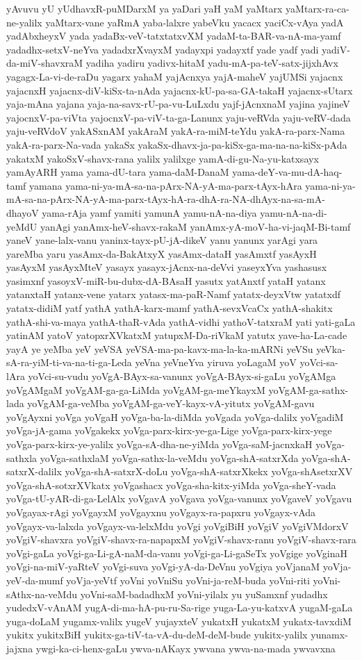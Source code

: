 {yAvuvu
yU
yUdhavxR-puMDarxM
ya
yaDari
yaH
yaM
yaMtarx
yaMtarx-ra-ca-ne-yalilx
yaMtarx-vane
yaRmA
yaba-lalxre
yabeVku
yacacx
yaciCx-vAya
yadA
yadAbxheyxV
yada
yadaBx-veV-tatxtatxvXM
yadaM-ta-BAR-va-nA-ma-yamf
yadadhx-setxV-neYva
yadadxrXvayxM
yadayxpi
yadayxtf
yade
yadf
yadi
yadiV-da-miV-shavxraM
yadiha
yadiru
yadivx-hitaM
yadu-mA-pa-teV-satx-jijxhAvx
yagagx-La-vi-de-raDu
yagarx
yahaM
yajAcnxya
yajA-maheV
yajUMSi
yajacnx
yajacnxH
yajacnx-diV-kiSx-ta-nAda
yajacnx-kU-pa-sa-GA-takaH
yajacnx-sUtarx
yaja-mAna
yajana
yaja-na-savx-rU-pa-vu-LuLxdu
yajf-jAcnxnaM
yajina
yajineV
yajocnxV-pa-viVta
yajocnxV-pa-viV-ta-ga-Lanunx
yaju-veRVda
yaju-veRV-dada
yaju-veRVdoV
yakASxnAM
yakAraM
yakA-ra-miM-teYdu
yakA-ra-parx-Nama
yakA-ra-parx-Na-vada
yakaSx
yakaSx-dhavx-ja-pa-kiSx-ga-ma-na-na-kiSx-pAda
yakatxM
yakoSxV-shavx-rana
yalilx
yalilxge
yamA-di-gu-Na-yu-katxsayx
yamAyARH
yama
yama-dU-tara
yama-daM-DanaM
yama-deY-va-mu-dA-haq-tamf
yamana
yama-ni-ya-mA-sa-na-pArx-NA-yA-ma-parx-tAyx-hAra
yama-ni-ya-mA-sa-na-pArx-NA-yA-ma-parx-tAyx-hA-ra-dhA-ra-NA-dhAyx-na-sa-mA-dhayoV
yama-rAja
yamf
yamiti
yamunA
yamu-nA-na-diya
yamu-nA-na-di-yeMdU
yanAgi
yanAmx-heV-shavx-rakaM
yanAmx-yA-moV-ha-vi-jaqM-Bi-tamf
yaneV
yane-lalx-vanu
yaninx-tayx-pU-jA-dikeV
yanu
yanunx
yarAgi
yara
yareMba
yaru
yasAmx-da-BakAtxyX
yasAmx-dataH
yasAmxtf
yasAyxH
yasAyxM
yasAyxMteV
yasayx
yasayx-jAcnx-na-deVvi
yaseyxYva
yashasusx
yasimxnf
yasoyxV-miR-bu-dubx-dA-BAsaH
yasutx
yatAnxtf
yataH
yatanx
yatanxtaH
yatanx-vene
yatarx
yatasx-ma-paR-Namf
yatatx-deyxVtw
yatatxdf
yatatx-didiM
yatf
yathA
yathA-karx-mamf
yathA-sevxVcaCx
yathA-shakitx
yathA-shi-va-maya
yathA-thaR-vAda
yathA-vidhi
yathoV-tatxraM
yati
yati-gaLa
yatinAM
yatoV
yatopxrXVkatxM
yatupxM-Da-riVkaM
yatutx
yave-ha-La-cade
yayA
ye
yeMba
yeV
yeVSA
yeVSA-ma-pa-kavx-ma-la-ka-mARNi
yeVSu
yeVka-sA-ra-yiM-ti-va-na-ti-ga-Leda
yeVna
yeVneYva
yiruva
yoLagaM
yoV
yoVci-sa-lAra
yoVci-su-vudu
yoVgA-BAyx-sa-vanunx
yoVgA-BAyx-si-gaLu
yoVgAMga
yoVgAMgaM
yoVgAM-ga-ga-LiMda
yoVgAM-ga-meYkayxM
yoVgAM-ga-sathx-lada
yoVgAM-ga-veMba
yoVgAM-ga-veY-kayx-vA-yitutx
yoVgAM-gavu
yoVgAyxni
yoVga
yoVgaH
yoVga-ba-la-diMda
yoVgada
yoVga-dalilx
yoVgadiM
yoVga-jA-gama
yoVgakekx
yoVga-parx-kirx-ye-ga-Lige
yoVga-parx-kirx-yege
yoVga-parx-kirx-ye-yalilx
yoVga-sA-dha-ne-yiMda
yoVga-saM-jacnxkaH
yoVga-sathxla
yoVga-sathxlaM
yoVga-sathx-la-veMdu
yoVga-shA-satxrXda
yoVga-shA-satxrX-dalilx
yoVga-shA-satxrX-doLu
yoVga-shA-satxrXkekx
yoVga-shAsetxrXV
yoVga-shA-sotxrXVkatx
yoVgashacx
yoVga-sha-kitx-yiMda
yoVga-sheY-vada
yoVga-tU-yAR-di-ga-LelAlx
yoVgavA
yoVgava
yoVga-vanunx
yoVgaveV
yoVgavu
yoVgayax-rAgi
yoVgayxM
yoVgayxnu
yoVgayx-ra-papxru
yoVgayx-vAda
yoVgayx-va-lalxda
yoVgayx-va-lelxMdu
yoVgi
yoVgiBiH
yoVgiV
yoVgiVMdorxV
yoVgiV-shavxra
yoVgiV-shavx-ra-napapxM
yoVgiV-shavx-ranu
yoVgiV-shavx-rara
yoVgi-gaLa
yoVgi-ga-Li-gA-naM-da-vanu
yoVgi-ga-Li-gaSeTx
yoVgige
yoVginaH
yoVgi-na-miV-yaRteV
yoVgi-suva
yoVgi-yA-da-DeVnu
yoVgiya
yoVjanaM
yoVja-yeV-da-mumf
yoVja-yeVtf
yoVni
yoVniSu
yoVni-ja-reM-buda
yoVni-riti
yoVni-sAthx-na-veMdu
yoVni-saM-badadhxM
yoVni-yilalx
yu
yuSamxnf
yudadhx
yudedxV-vAnAM
yugA-di-ma-hA-pu-ru-Sa-rige
yuga-La-yu-katxvA
yugaM-gaLa
yuga-doLaM
yugamx-valilx
yugeV
yujayxteV
yukatxH
yukatxM
yukatx-tavxdiM
yukitx
yukitxBiH
yukitx-ga-tiV-ta-vA-du-deM-deM-bude
yukitx-yalilx
yunamx-jajxna
ywgi-ka-ci-henx-gaLu
ywva-nAKayx
ywvana
ywva-na-mada
ywvavxna
}
